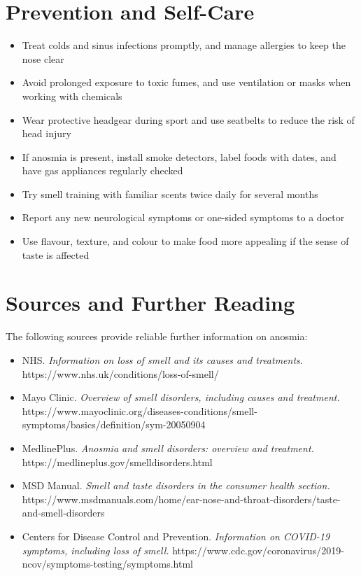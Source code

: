 \section*{Prevention and Self-Care}
\begin{itemize}
    \item Treat colds and sinus infections promptly, and manage allergies to keep the nose clear
    \item Avoid prolonged exposure to toxic fumes, and use ventilation or masks when working with chemicals
    \item Wear protective headgear during sport and use seatbelts to reduce the risk of head injury
    \item If anosmia is present, install smoke detectors, label foods with dates, and have gas appliances regularly checked
    \item Try smell training with familiar scents twice daily for several months
    \item Report any new neurological symptoms or one-sided symptoms to a doctor
    \item Use flavour, texture, and colour to make food more appealing if the sense of taste is affected
\end{itemize}

\section*{Sources and Further Reading}
The following sources provide reliable further information on anosmia:

\begin{itemize}
    \item NHS. \textit{Information on loss of smell and its causes and treatments.} https://www.nhs.uk/conditions/loss-of-smell/
    \item Mayo Clinic. \textit{Overview of smell disorders, including causes and treatment.} https://www.mayoclinic.org/diseases-conditions/smell-symptoms/basics/definition/sym-20050904
    \item MedlinePlus. \textit{Anosmia and smell disorders: overview and treatment.} https://medlineplus.gov/smelldisorders.html
    \item MSD Manual. \textit{Smell and taste disorders in the consumer health section.} https://www.msdmanuals.com/home/ear-nose-and-throat-disorders/taste-and-smell-disorders
    \item Centers for Disease Control and Prevention. \textit{Information on COVID-19 symptoms, including loss of smell.} https://www.cdc.gov/coronavirus/2019-ncov/symptoms-testing/symptoms.html
\end{itemize}
